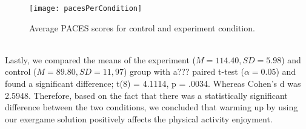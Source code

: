 \begin{figure}[h]
    \centering
    \texttt{[image: pacesPerCondition]}
    \caption{Average PACES scores for control and experiment condition.}
\label{fig:pacesPerCondition}
\end{figure}\\
Lastly, we compared the means of the experiment (\begin{math}M = 114.40 , SD = 5.98\end{math}) and control (\begin{math}M = 89.80, SD = 11,97\end{math}) group with a??? paired t-test (\begin{math}\alpha = 0.05\end{math}) and found a significant difference; t(8) = 4.1114, p = .0034. Whereas Cohen's d was 2.5948. Therefore, based on the fact that there was a statistically significant difference between the two conditions, we concluded that warming up by using our exergame solution positively affects the physical activity enjoyment.
